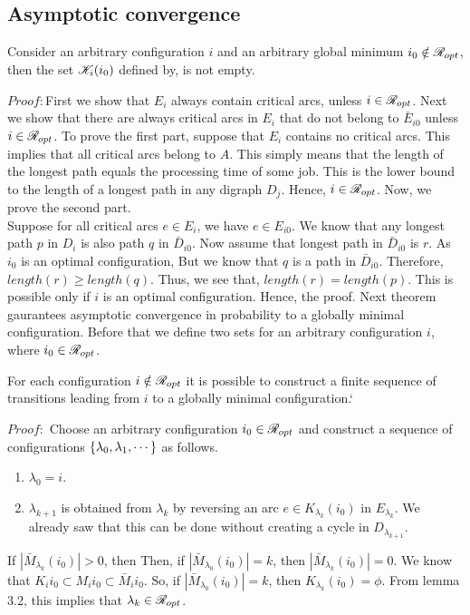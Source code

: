 \documentclass[letterpaper,english,10pt]{article}
\begin{document}
\subsection{Asymptotic convergence}
\begin{lem}
Consider an arbitrary configuration $i$ and an arbitrary global minimum $i_0 \notin \mathscr{R}_{opt}$, then the set 
$\mathscr{K}_i(i_0)$ defined by,
is not empty.
\end{lem} 
$Proof:$First we show that $E_i$ always contain critical arcs, unless $i \in \mathscr{R}_{opt}$. 
Next we show that there are always critical arcs in $E_i$ that do not belong to $\bar{E}_{i0}$ unless  $i \in \mathscr{R}_{opt}$.
To prove the first part, suppose that $E_i$ contains no critical arcs. This implies that all critical arcs belong to $A$. This simply means that the length of the longest path equals the processing time of some job. This is the lower bound to the length of a longest path in any digraph $D_j$. Hence, $i \in \mathscr{R}_{opt}$.
Now, we prove the second part.\\ 
Suppose for all critical arcs $e \in E_i$, we have $e \in E_{i0}$. We know that any longest path $p$ in $D_i$ is also path $q$ in $\bar{D}_{i0}$. 
Now assume that longest path in $\bar{D}_{i0}$ is $r$. As $i_0$ is an optimal configuration,
But we know that $q$ is a path in $\bar{D}_{i0}$. Therefore, $length(r) \geq length(q)$. Thus, we see that, $length(r) = length(p)$. This is possible only if $i$ is an optimal configuration. Hence, the proof.
Next theorem gaurantees asymptotic convergence in probability to a globally minimal configuration.
Before that we define two sets for an arbitrary configuration $i$,
where $i_0 \in \mathscr{R}_{opt}$.
\begin{thm}
For each configuration $i \notin \mathscr{R}_{opt}$ it is possible to construct a finite sequence of transitions leading from $i$ to a globally minimal configuration.`
\end{thm}
$Proof:$ Choose an arbitrary configuration $i_0 \in \mathscr{R}_{opt}$ and construct a sequence of configurations $\left\{\lambda_0, \lambda_1,\cdots\right\}$ as follows.
\begin{enumerate}
\item $\lambda_0 = i$.
\item $\lambda_{k+1}$ is obtained from $\lambda_k$ by reversing an arc $e \in K_{\lambda_k}(i_0)$ in $E_{\lambda_k}$. We already saw that this can be done without creating a cycle in $D_{\lambda_{k+1}}$.
\end{enumerate}
If $|\bar M_{\lambda_k}(i_0)| > 0$, then
Then, if $|\bar M_{\lambda_0}(i_0)| = k$, then $|\bar M_{\lambda_k}(i_0)| = 0$. 
We know that $K_i{i_0} \subset M_i{i_0} \subset \bar M_i{i_0}$. So, if $|\bar M_{\lambda_0}(i_0)| = k$, then  $K_{\lambda_k}(i_0)= \phi$. From lemma 3.2, this implies that $\lambda_k \in \mathscr{R}_{opt}$.
\end{document}
